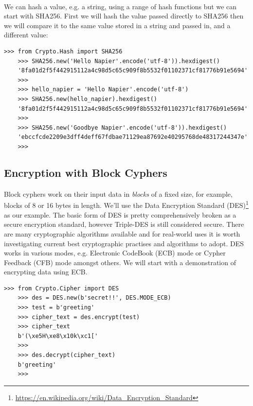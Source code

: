 \documentclass[12pt, a4paper, oneside]{book}
\begin{document}
{\paragraph{} We can hash a value, e.g. a string, using a range of hash functions but we can start with SHA256. First we will hash the value passed directly to SHA256 then we will compare it to the same value stored in a string and passed in, and a different value:

\begin{lstlisting}[style=DOS]
    >>> from Crypto.Hash import SHA256
    >>> SHA256.new('Hello Napier'.encode('utf-8')).hexdigest()
    '8fa01d2f5f442915112a4c98d5c65c909f8b5532f01102371cf81776b91e5694'
    >>>
    >>> hello_napier = 'Hello Napier'.encode('utf-8')
    >>> SHA256.new(hello_napier).hexdigest()
    '8fa01d2f5f442915112a4c98d5c65c909f8b5532f01102371cf81776b91e5694'
    >>> 
    >>> SHA256.new('Goodbye Napier'.encode('utf-8')).hexdigest()
    'ebccfcde2209e3dff4deff67fdbae71129ea87692e40295768de48317244347e'
    >>>
\end{lstlisting}

\subsection{Encryption with Block Cyphers}
\paragraph{} Block cyphers work on their input data in \emph{blocks} of a fixed size, for example, blocks of 8 or 16 bytes in length. We'll use the Data Encryption Standard (DES)\footnote{\url{https://en.wikipedia.org/wiki/Data_Encryption_Standard}} as our example. The basic form of DES is pretty comprehensively broken as a secure encryption standard, however Triple-DES is still considered secure. There are many cryptographic algorithms available and for real-world uses it is worth investigating current best cryptographic practises and algorithms to adopt. DES works in various modes, e.g. Electronic CodeBook (ECB) mode or Cypher Feedback (CFB) mode amongst others. We will start with a demonstration of encrypting data using ECB.

\begin{lstlisting}[style=DOS]
    >>> from Crypto.Cipher import DES
    >>> des = DES.new(b'secret!!', DES.MODE_ECB)
    >>> test = b'greeting'
    >>> cipher_text = des.encrypt(test)
    >>> cipher_text
    b'(\xe5H\xe8\x10k\xc1['
    >>> 
    >>> des.decrypt(cipher_text)
    b'greeting'
    >>> 
\end{lstlisting}

}
\end{document}
